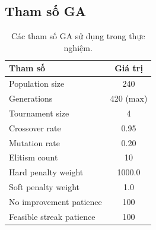 \subsection{Tham số GA}
\begin{table}[H]
    \centering
    \begin{tabular}{|l|c|}
        \hline
        \textbf{Tham số} & \textbf{Giá trị} \\ \hline
        Population size & 240 \\ \hline
        Generations & 420 (max) \\ \hline
        Tournament size & 4 \\ \hline
        Crossover rate & 0.95 \\ \hline
        Mutation rate & 0.20 \\ \hline
        Elitism count & 10 \\ \hline
        Hard penalty weight & 1000.0 \\ \hline
        Soft penalty weight & 1.0 \\ \hline
        No improvement patience & 100 \\ \hline
        Feasible streak patience & 100 \\ \hline
    \end{tabular}
    \caption{Các tham số GA sử dụng trong thực nghiệm.}
\end{table}

